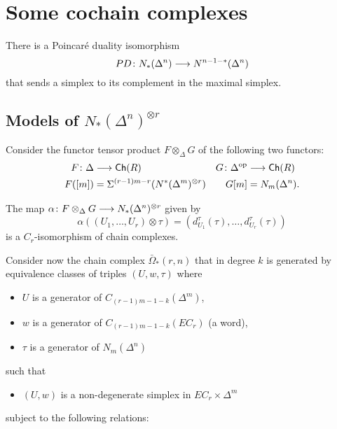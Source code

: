 \section{Some cochain complexes}
There is a Poincaré duality isomorphism
\[PD\colon N_*(\Delta^n)\longrightarrow N^{n-1-*}(\Delta^n)\]
that sends a simplex to its complement in the maximal simplex.


\subsection{Models of $N_*(\Delta^n)^{\otimes r}$}
Consider the functor tensor product $F\otimes_{\Delta}G$ of the following two functors:
\begin{align*}
	F\colon \Delta&\longrightarrow \mathsf{Ch}(R)&  G\colon \Delta^{\mathrm{op}}&\longrightarrow \mathsf{Ch}(R)\\
	F([m])&=\Sigma^{(r-1)m-r}(N^*(\Delta^m)^{\otimes r})&  G[m] &= N_m(\Delta^n).
\end{align*}
\begin{lemma} The map $\alpha\colon F\otimes_{\Delta} G\longrightarrow N_*(\Delta^n)^{\otimes r}$ given by
	\[\alpha((U_1,\ldots,U_r)\otimes \tau) = (d_{U_1}^\tau(\tau),\ldots, d_{U_r}^\tau(\tau))\]
	is a  $C_r$-isomorphism of chain complexes.
\end{lemma}
Consider now the chain complex $\bar{\Omega}_*(r,n)$ that in degree $k$ is generated by equivalence classes of triples $(U,w,\tau)$ where 
\begin{itemize}
	\item $U$ is a generator of $C_{(r-1)m-1-k}(\Delta^m)$,
	\item $w$ is a generator of $C_{(r-1)m-1-k}(EC_r)$ (a word),
	\item $\tau$ is a generator of $N_m(\Delta^n)$
\end{itemize}
such that
\begin{itemize}
	\item $(U,w)$ is a non-degenerate simplex in $EC_r\times \Delta^m$
\end{itemize}
subject to the following relations:
